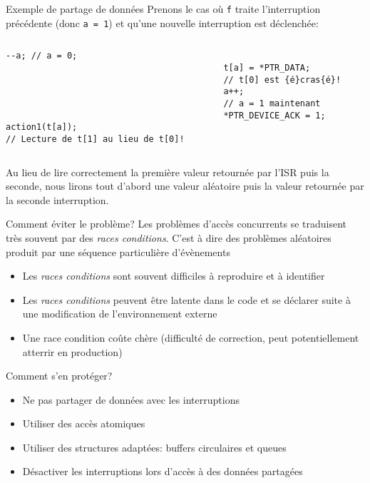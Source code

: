 \begin{frame}[fragile]{Exemple de partage de données}
  Prenons le  cas où  \verb+f+ traite l'interruption  précédente (donc
  \verb+a = 1+) et qu'une nouvelle interruption est déclenchée:
  \begin{columns}
    \begin{column}{5cm}
      \begin{lstlisting}[showlines=true,emptylines=10]
--a; // a = 0;





action1(t[a]);
// Lecture de t[1] au lieu de t[0]!
       \end{lstlisting}
     \end{column}
     \begin{column}{5cm}
      \begin{lstlisting}[showlines=true,emptylines=10,escapeinside=\{\}]

t[a] = *PTR_DATA;
// t[0] est {é}cras{é}!
a++;
// a = 1 maintenant
*PTR_DEVICE_ACK = 1;


       \end{lstlisting}
    \end{column}
  \end{columns}
  Au lieu de lire correctement  la première valeur retournée par l'ISR
  puis la seconde, nous lirons  tout d'abord une valeur aléatoire puis
  la valeur retournée par la seconde interruption.
\end{frame}

\begin{frame}{Comment éviter le problème?}
  Les problèmes d'accès concurrents se traduisent très souvent par des
  \emph{races  conditions}.   C'est à  dire  des problèmes  aléatoires
  produit par une séquence particulière d'évènements
  \begin{itemize}
  \item  Les   \emph{races  conditions}  sont   souvent  difficiles  à
    reproduire et à identifier
  \item Les \emph{races conditions}  peuvent être latente dans le code
    et se déclarer suite à une modification de l'environnement externe
  \item Une race condition coûte chère (difficulté de correction, peut
    potentiellement atterrir en production)
  \end{itemize}
  Comment s'en protéger?
  \begin{itemize}
  \item  Ne  pas  partager de données avec les interruptions
  \item Utiliser des accès atomiques
  \item  Utiliser  des  structures  adaptées: buffers  circulaires  et
    queues
  \item  Désactiver  les  interruptions  lors d'accès  à  des  données
    partagées
  \end{itemize}
\end{frame}

